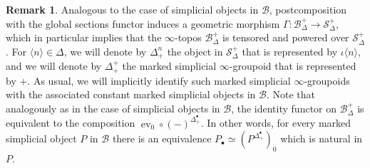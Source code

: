 \documentclass[reqno]{amsart}
\numberwithin{equation}{subsection}
\theoremstyle{plain}
\theoremstyle{definition}
\newtheorem{remark}[equation]{Remark}
\let\scr=\mathcal
\def\BB{\scr B}
\def\SS{\scr S}
\DeclareMathOperator{\ev}{ev}
\newcommand{\ord}[1]{\langle#1\rangle}
\newcommand{\mSimp}[1]{#1_{\Delta}^+}
\begin{document}
\begin{remark}
	\label{tensoringCotensoringMarked}
	Analogous to the case of simplicial objects in $\BB$, postcomposition with the global sections functor induces a geometric morphism $\Gamma\colon\mSimp\BB\to\mSimp\SS$, which in particular implies that the $\infty$-topos $\mSimp\BB$ is tensored and powered over $\mSimp\SS$. For $\ord{n}\in\Delta$, we will denote by $\Delta_+^n$ the object in $\mSimp\SS$ that is represented by $\iota\ord n$, and we will denote by $\Delta_+^+$ the marked simplicial $\infty$-groupoid that is represented by $+$. As usual, we will implicitly identify such marked simplicial $\infty$-groupoids with the associated constant marked simplicial objects in $\BB$. Note that analogously as in the case of simplicial objects in $\BB$, the identity functor on $\mSimp\BB$ is equivalent to the composition $\ev_0\circ(-)^{\Delta^\bullet_+}$. In other words, for every marked simplicial object $P$ in $\BB$ there is an equivalence $P_\bullet\simeq (P^{\Delta^\bullet_+})_0$ which is natural in $P$.
\end{remark}
\end{document}
